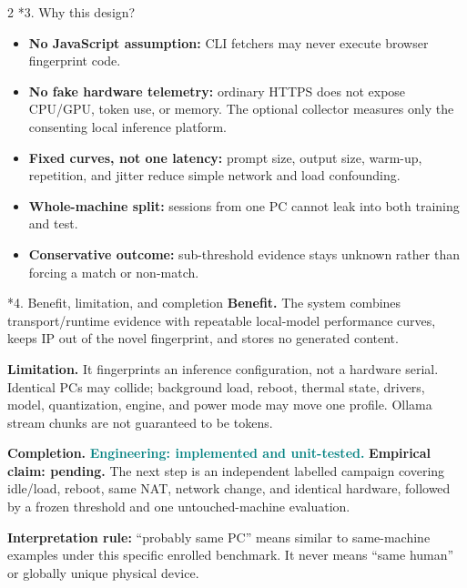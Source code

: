 \documentclass{article}
\makeatletter
\renewcommand\section{\@startsection{section}{1}{\z@}{0.8ex plus .2ex}{0.35ex}{\normalfont\normalsize\bfseries\color{navy}}}
\newcommand{\status}[1]{\textcolor{teal}{\textbf{#1}}}
\makeatother
\begin{document}
\begin{multicols}{2}
\section*{3. Why this design?}
\begin{itemize}
\item \textbf{No JavaScript assumption:} CLI fetchers may never execute browser fingerprint code.
\item \textbf{No fake hardware telemetry:} ordinary HTTPS does not expose CPU/GPU, token use, or memory. The optional
collector measures only the consenting local inference platform.
\item \textbf{Fixed curves, not one latency:} prompt size, output size, warm-up, repetition, and jitter reduce simple
network and load confounding.
\item \textbf{Whole-machine split:} sessions from one PC cannot leak into both training and test.
\item \textbf{Conservative outcome:} sub-threshold evidence stays unknown rather than forcing a match or non-match.
\end{itemize}

\section*{4. Benefit, limitation, and completion}
\textbf{Benefit.} The system combines transport/runtime evidence with repeatable local-model performance curves,
keeps IP out of the novel fingerprint, and stores no generated content.

\textbf{Limitation.} It fingerprints an inference configuration, not a hardware serial. Identical PCs may collide;
background load, reboot, thermal state, drivers, model, quantization, engine, and power mode may move one profile.
Ollama stream chunks are not guaranteed to be tokens.

\textbf{Completion.} \status{Engineering: implemented and unit-tested.} \textbf{Empirical claim: pending.} The next
step is an independent labelled campaign covering idle/load, reboot, same NAT, network change, and identical
hardware, followed by a frozen threshold and one untouched-machine evaluation.
\end{multicols}

\vfill
{\scriptsize \textbf{Interpretation rule:} ``probably same PC'' means similar to same-machine examples under this
specific enrolled benchmark. It never means ``same human'' or globally unique physical device.}
\end{document}

